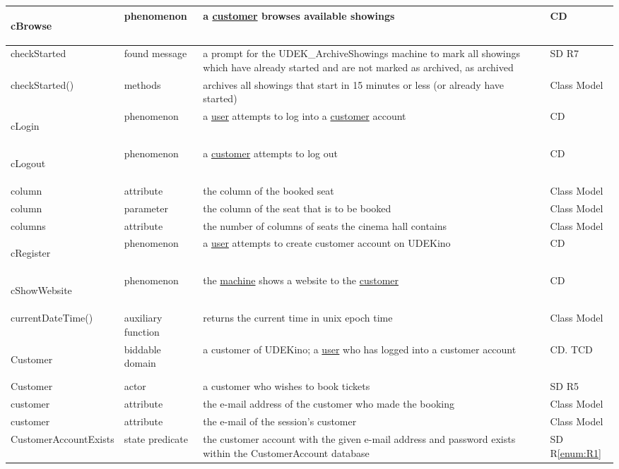 \documentclass[a4paper,10pt,titlepage,bibtotoc,bibtotocnumbered]{scrreprt}
\begin{document}
\begin{longtable}{|p{.4\linewidth}|p{.2\linewidth}|p{.2\linewidth}|p{.2\linewidth}|}
\hline
\hypertarget{glossary:cBrowse}{cBrowse} & phenomenon & a \hyperlink{glossary:Customer}{customer} browses available showings & CD\\
\hline
checkStarted & found message & a prompt for the UDEK\_ArchiveShowings machine to mark all showings which have already started and are not marked as archived, as archived & SD R7\\
\hline
checkStarted() & methods & archives all showings that start in 15 minutes or less (or already have started) & Class Model\\
\hline
\hypertarget{glossary:cLogin}{cLogin} & phenomenon & a \hyperlink{glossary:User}{user} attempts to log into a \hyperlink{glossary:Customer}{customer} account & CD\\
\hline
\hypertarget{glossary:cLogout}{cLogout} & phenomenon & a \hyperlink{glossary:Customer}{customer} attempts to log out & CD\\
\hline
column & attribute & the column of the booked seat & Class Model\\
\hline
column & parameter & the column of the seat that is to be booked & Class Model\\
\hline
columns & attribute & the number of columns of seats the cinema hall contains & Class Model\\
\hline
\hypertarget{glossary:cRegister}{cRegister} & phenomenon & a \hyperlink{glossary:User}{user} attempts to create customer account on UDEKino & CD\\
\hline
\hypertarget{glossary:cShowWebsite}{cShowWebsite} & phenomenon & the \hyperlink{glossary:UDEKino}{machine} shows a website to the \hyperlink{glossary:Customer}{customer} & CD\\
\hline
currentDateTime() & auxiliary function & returns the current time in unix epoch time & Class Model\\
\hline
\hypertarget{glossary:Customer}{Customer} & biddable domain & a customer of UDEKino; a \hyperlink{glossary:User}{user} who has logged into a customer account & CD. TCD\\
\hline
Customer & actor & a customer who wishes to book tickets & SD R5\\
\hline
customer & attribute & the e-mail address of the customer who made the booking & Class Model\\
\hline
customer & attribute & the e-mail of the session's customer & Class Model\\
\hline
CustomerAccountExists & state predicate & the customer account with the given e-mail address and password exists within the CustomerAccount database & SD R\ref{enum:R1}\\

\end{longtable}
\end{document}
